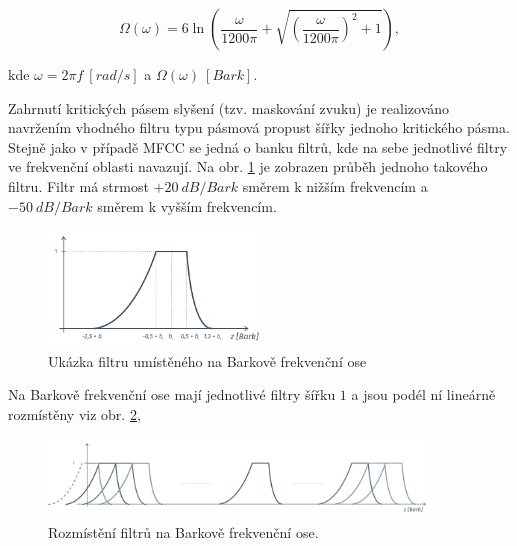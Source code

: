 \begin{equation}
  \Omega\left(\omega\right) = 6 \ln \left( \frac{\omega}{1200\pi} + \sqrt{\left(\frac{\omega}{1200\pi}\right)^2 + 1} \right),
  \label{eq:asr:plp:transform}
\end{equation}

\noindent kde $\omega = 2\pi f\ \left[rad/s\right]$ a $\Omega\left(\omega\right)\ \left[Bark\right]$.

Zahrnutí kritických pásem slyšení (tzv. maskování zvuku) je realizováno navržením vhodného filtru typu pásmová propust šířky jednoho kritického pásma. Stejně jako v případě MFCC se jedná o banku filtrů, kde na sebe jednotlivé filtry ve frekvenční oblasti navazují.
Na obr. \ref{fig:asr:plp:filter} je zobrazen průběh jednoho takového filtru. Filtr má strmost $+20\ dB/Bark$ směrem k nižším frekvencím a $-50\ dB/Bark$ směrem k vyšším frekvencím.

\begin{figure}[hbpt]
  \centering
  \includegraphics[width=0.5\textwidth]{./ch4-asr/img/plp_filter.pdf}
  \caption{Ukázka filtru umístěného na Barkově frekvenční ose}
  \label{fig:asr:plp:filter}
\end{figure}

Na Barkově frekvenční ose mají jednotlivé filtry šířku $1$ a jsou podél ní lineárně rozmístěny viz obr. \ref{fig:asr:plp:bank},

\begin{figure}[hbpt]
  \centering
  \includegraphics[width=0.9\textwidth]{./ch4-asr/img/plp-bank.pdf}
  \caption{Rozmístění filtrů na Barkově frekvenční ose.}
  \label{fig:asr:plp:bank}
\end{figure}

